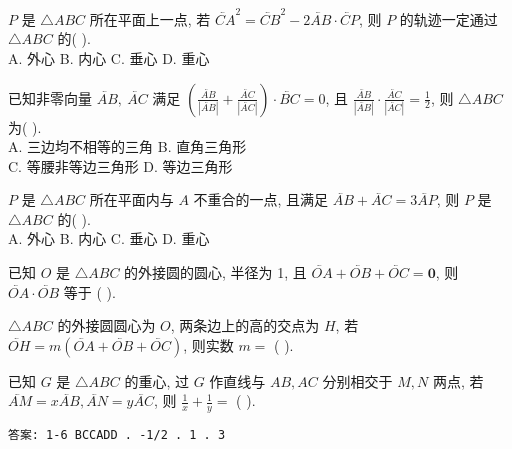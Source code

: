 \begin{exercise}
    $P$ 是 $\triangle ABC$ 所在平面上一点, 若 $\lvec{CA}^{2}=\lvec{CB}^{2}-2 \lvec{AB} \cdot \lvec{CP}$, 则 $P$ 的轨迹一定通过 $\triangle ABC$ 的( \quad ). \\
    A. 外心 \qquad B. 内心 \qquad C. 垂心 \qquad D. 重心
\end{exercise}

\begin{exercise}
    已知非零向量 $\lvec{AB}, ~ \lvec{AC}$ 满足 $\left(\frac{\lvec{AB}}{|\lvec{AB}|}+\frac{\lvec{AC}}{|\lvec{AC}|}\right) \cdot \lvec{BC}=0$, 且 $\frac{\lvec{AB}}{|\lvec{AB}|} \cdot \frac{\lvec{AC}}{|\lvec{AC}|}=\frac{1}{2}$, 则 $\triangle ABC$ 为( \quad ). \\
    A. 三边均不相等的三角 \qquad B. 直角三角形 \\
    C. 等腰非等边三角形 \qquad D. 等边三角形
\end{exercise}

\begin{exercise}
    $P$ 是 $\triangle ABC$ 所在平面内与 $A$ 不重合的一点, 且满足 $\lvec{AB}+\lvec{AC}=3 \lvec{AP}$, 则 $P$ 是 $\triangle ABC$ 的( \quad ). \\
    A. 外心 \qquad B. 内心 \qquad C. 垂心 \qquad D. 重心
\end{exercise}

\begin{exercise}
    已知 $O$ 是 $\triangle ABC$ 的外接圆的圆心, 半径为 1, 且 $\lvec{OA}+\lvec{OB}+\lvec{OC}=\boldsymbol{0}$, 则 $\lvec{OA} \cdot \lvec{OB}$ 等于 ( \quad ).
\end{exercise}

\begin{exercise}
    $\triangle ABC$ 的外接圆圆心为 $O$, 两条边上的高的交点为 $H$, 若 $\lvec{OH}=m(\lvec{OA}+\lvec{OB}+\lvec{OC})$, 则实数 $m=$ ( \quad ).
\end{exercise}

\begin{exercise}
    已知 $G$ 是 $\triangle ABC$ 的重心, 过 $G$ 作直线与 $AB, AC$ 分别相交于 $M, N$ 两点, 若 $\lvec{AM}=x \lvec{AB}, \lvec{AN}=y \lvec{AC}$, 则 $\frac{1}{x}+\frac{1}{y}=$ ( \quad ).
\end{exercise}

\texttt{答案: 1-6 BCCADD . -1/2 . 1  . 3}